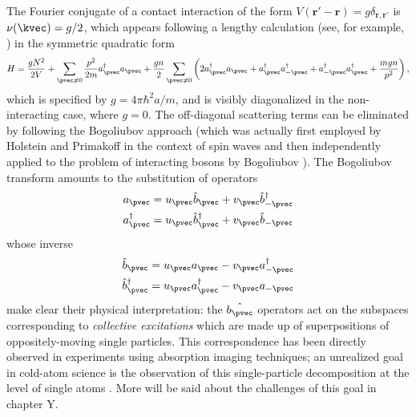 {{{{{{	The Fourier conjugate of a contact interaction of the form $V(\textbf{r}'-\textbf{r})=g\delta_{\textbf{r},\textbf{r}'}$ is $\nu(\kvec)=g/2$, which appears 	following a lengthy calculation (see, for example, \cite{PitaevskiiStringari}) in the symmetric quadratic form
	\begin{equation}
		H = \frac{gN^2}{2V} + \sum_{\pvec\neq0}\frac{p^2}{2m}a^\dagger_\pvec a_\pvec + \frac{gn}{2}\sum_{\pvec\neq0}\left(2a^\dagger_\pvec a_\pvec + a^\dagger_\pvec a^\dagger_{-\pvec} + a^\dagger_{-\pvec} a^\dagger_{\pvec} + \frac{mgn}{p^2}\right),
		\label{eqn:bog_H}
	\end{equation}
	which is specified by $g=4\pi\hbar^2a/m$, and is visibly diagonalized in the non-interacting case, where $g=0$. The off-diagonal scattering terms can be eliminated by following the Bogoliubov approach (which was actually first employed by Holstein and Primakoff in the context of spin waves \cite{schwabl} and then independently applied to the problem of interacting bosons by Bogoliubov \cite{bologiubov47}). The Bogoliubov transform amounts to the substitution of operators
	\begin{align}
		a_\pvec &= u_\pvec \hat{b}_\pvec + v_\pvec \hat{b}^\dagger_{-\pvec}\\
		a_\pvec^\dagger &= u_\pvec\hat{b}_\pvec^\dagger + v_\pvec \hat{b}_{-\pvec}
		\label{bogotrans}
	\end{align}
	whose inverse
	\begin{align}
		\hat{b}_\pvec &= u_\pvec a_\pvec - v_\pvec a^\dagger_{-\pvec}\\
		\hat{b}_\pvec^\dagger &= u_\pvec a_\pvec^\dagger - v_\pvec a_{-\pvec}
		\label{bogoinverse}
	\end{align}
	make clear their physical interpretation: the $\hat{b_\pvec}$ operators act on the subspaces corresponding to \emph{collective excitations} which are made up of superpositions of oppositely-moving single particles. This correspondence has been directly observed in experiments \cite{vogels02} using absorption imaging techniques; an unrealized goal in cold-atom science is the observation of this single-particle decomposition at the level of single atoms . More will be said about the challenges of this goal in chapter Y. 
	
}}}}}}
